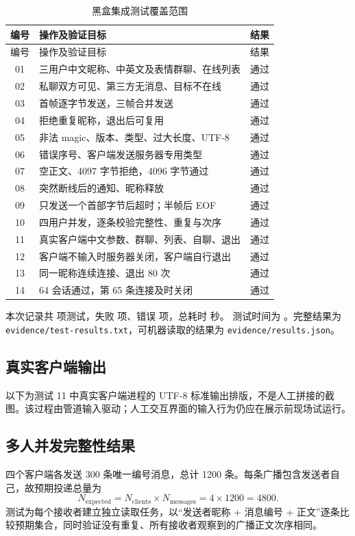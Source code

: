 \documentclass[UTF8,notitlepage,11pt]{ctexart}
\newcommand{\src}[1]{\nolinkurl{#1}}
\begin{document}
\begin{longtable}{c p{} p{}}
\caption{黑盒集成测试覆盖范围}\\\toprule
编号 & 操作及验证目标 & 结果\\\midrule\endfirsthead
\toprule 编号 & 操作及验证目标 & 结果\\\midrule\endhead
01 & 三用户中文昵称、中英文及表情群聊、在线列表 & 通过\\
02 & 私聊双方可见、第三方无消息、目标不在线 & 通过\\
03 & 首帧逐字节发送，三帧合并发送 & 通过\\
04 & 拒绝重复昵称，退出后可复用 & 通过\\
05 & 非法 magic、版本、类型、过大长度、UTF-8 & 通过\\
06 & 错误序号、客户端发送服务器专用类型 & 通过\\
07 & 空正文、4097 字节拒绝，4096 字节通过 & 通过\\
08 & 突然断线后的通知、昵称释放 & 通过\\
09 & 只发送一个首部字节后超时；半帧后 EOF & 通过\\
10 & 四用户并发，逐条校验完整性、重复与次序 & 通过\\
11 & 真实客户端中文参数、群聊、列表、自聊、退出 & 通过\\
12 & 客户端不输入时服务器关闭，客户端自行退出 & 通过\\
13 & 同一昵称连续连接、退出 80 次 & 通过\\
14 & 64 会话通过，第 65 条连接及时关闭 & 通过\\\bottomrule
\end{longtable}

本次记录共 \TestCount{} 项测试，失败 \FailureCount{} 项、错误 \ErrorCount{} 项，总耗时 \TestDuration{} 秒。
测试时间为 \TestTimestamp{}。完整结果为 \src{evidence/test-results.txt}，可机器读取的结果为 \src{evidence/results.json}。

\subsection{真实客户端输出}
以下为测试 11 中真实客户端进程的 UTF-8 标准输出排版，不是人工拼接的截图。该过程由管道输入驱动；人工交互界面的输入行为仍应在展示前现场试运行。

\subsection{多人并发完整性结果}
四个客户端各发送 300 条唯一编号消息，总计 1200 条。每条广播包含发送者自己，故预期投递总量为
\[
N_{\mathrm{expected}}=N_{\mathrm{clients}}\times N_{\mathrm{messages}}
=4\times1200=4800.
\]
测试为每个接收者建立独立读取任务，以“发送者昵称 + 消息编号 + 正文”逐条比较预期集合，同时验证没有重复、所有接收者观察到的广播正文次序相同。
\end{document}
